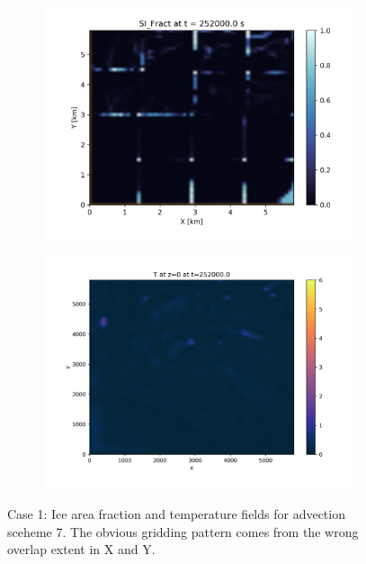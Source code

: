 \documentclass[11pt]{article}
\begin{document}
\begin{figure}[h!]
\centering
	\begin{subfigure}{0.85\textwidth}
		\includegraphics[width=\textwidth]{iceAdvect/advScheme-07-surface-ice-hd-0000025200.png}
	\end{subfigure}
 
	\begin{subfigure}{0.85\textwidth}
		\includegraphics[width=\textwidth]{iceAdvect/advScheme-07-surface-T-hd-0000025200.png}
	\end{subfigure}
\caption{Case 1: Ice area fraction and temperature fields for advection sceheme 7. The obvious gridding pattern comes from the wrong overlap extent in X and Y.}
\label{fig:advScheme7}
\end{figure}
\end{document}
